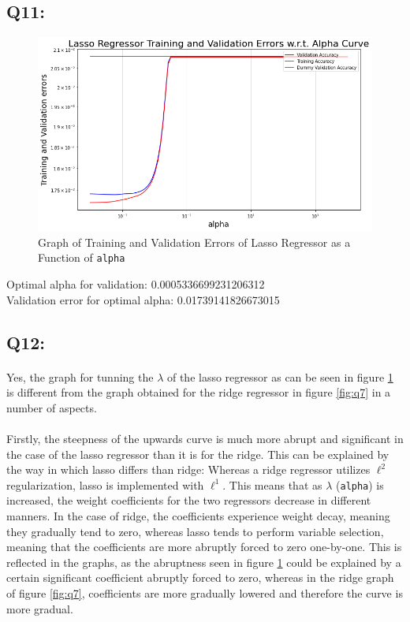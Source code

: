 \documentclass{article}
\newcommand{\code}[1]{\texttt{#1}}
\begin{document}
\subsection*{Q11:}
    \begin{figure}[H]
        \centering
        \includegraphics[scale=0.5]{q11.png}
        \caption{Graph of Training and Validation Errors of Lasso Regressor as a Function of \code{alpha}}
        \label{fig:q11}
    \end{figure}
    Optimal alpha for validation: 0.0005336699231206312\\
    Validation error for optimal alpha: 0.01739141826673015

\subsection*{Q12:}
    \paragraph*{}
    Yes, the graph for tunning the $\lambda$ of the lasso regressor as can be seen in figure \ref{fig:q11} is different from the graph obtained for the ridge regressor in figure \ref{fig:q7} in a number of aspects.
    \paragraph*{}
    Firstly, the steepness of the upwards curve is much more abrupt and significant in the case of the lasso regressor than it is for the ridge. This can be explained by the way in which lasso differs than ridge: Whereas a ridge regressor utilizes $\ell^2$ regularization, lasso is implemented with $\ell^1$. This means that as $\lambda$ (\code{alpha}) is increased, the weight coefficients for the two regressors decrease in different manners. In the case of ridge, the coefficients experience weight decay, meaning they gradually tend to zero, whereas lasso tends to perform variable selection, meaning that the coefficients are more abruptly forced to zero one-by-one. This is reflected in the graphs, as the abruptness seen in figure \ref{fig:q11} could be explained by a certain significant coefficient abruptly forced to zero, whereas in the ridge graph of figure \ref{fig:q7}, coefficients are more gradually lowered and therefore the curve is more gradual.
\end{document}
